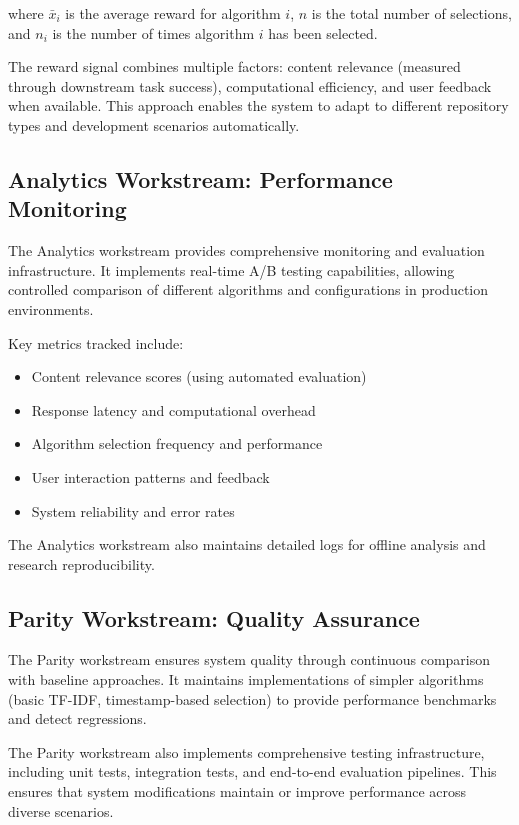 \documentclass[conference]{IEEEtran}
\begin{document}
where $\bar{x}_i$ is the average reward for algorithm $i$, $n$ is the total number of selections, and $n_i$ is the number of times algorithm $i$ has been selected.

The reward signal combines multiple factors: content relevance (measured through downstream task success), computational efficiency, and user feedback when available. This approach enables the system to adapt to different repository types and development scenarios automatically.

\subsection{Analytics Workstream: Performance Monitoring}

The Analytics workstream provides comprehensive monitoring and evaluation infrastructure. It implements real-time A/B testing capabilities, allowing controlled comparison of different algorithms and configurations in production environments.

Key metrics tracked include:
\begin{itemize}
\item Content relevance scores (using automated evaluation)
\item Response latency and computational overhead
\item Algorithm selection frequency and performance
\item User interaction patterns and feedback
\item System reliability and error rates
\end{itemize}

The Analytics workstream also maintains detailed logs for offline analysis and research reproducibility.

\subsection{Parity Workstream: Quality Assurance}

The Parity workstream ensures system quality through continuous comparison with baseline approaches. It maintains implementations of simpler algorithms (basic TF-IDF, timestamp-based selection) to provide performance benchmarks and detect regressions.

The Parity workstream also implements comprehensive testing infrastructure, including unit tests, integration tests, and end-to-end evaluation pipelines. This ensures that system modifications maintain or improve performance across diverse scenarios.
\end{document}
